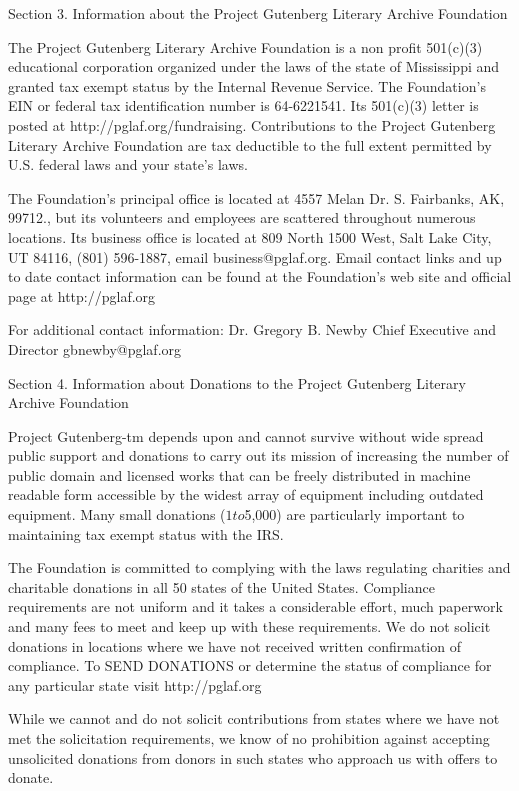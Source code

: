 Section 3.  Information about the Project Gutenberg Literary Archive
Foundation

The Project Gutenberg Literary Archive Foundation is a non profit
501(c)(3) educational corporation organized under the laws of the
state of Mississippi and granted tax exempt status by the Internal
Revenue Service.  The Foundation’s EIN or federal tax identification
number is 64-6221541.  Its 501(c)(3) letter is posted at
http://pglaf.org/fundraising.  Contributions to the Project Gutenberg
Literary Archive Foundation are tax deductible to the full extent
permitted by U.S. federal laws and your state’s laws.

The Foundation’s principal office is located at 4557 Melan Dr. S.
Fairbanks, AK, 99712., but its volunteers and employees are scattered
throughout numerous locations.  Its business office is located at
809 North 1500 West, Salt Lake City, UT 84116, (801) 596-1887, email
business@pglaf.org.  Email contact links and up to date contact
information can be found at the Foundation’s web site and official
page at http://pglaf.org

For additional contact information:
     Dr. Gregory B. Newby
     Chief Executive and Director
     gbnewby@pglaf.org


Section 4.  Information about Donations to the Project Gutenberg
Literary Archive Foundation

Project Gutenberg-tm depends upon and cannot survive without wide
spread public support and donations to carry out its mission of
increasing the number of public domain and licensed works that can be
freely distributed in machine readable form accessible by the widest
array of equipment including outdated equipment.  Many small donations
($1 to $5,000) are particularly important to maintaining tax exempt
status with the IRS.

The Foundation is committed to complying with the laws regulating
charities and charitable donations in all 50 states of the United
States.  Compliance requirements are not uniform and it takes a
considerable effort, much paperwork and many fees to meet and keep up
with these requirements.  We do not solicit donations in locations
where we have not received written confirmation of compliance.  To
SEND DONATIONS or determine the status of compliance for any
particular state visit http://pglaf.org

While we cannot and do not solicit contributions from states where we
have not met the solicitation requirements, we know of no prohibition
against accepting unsolicited donations from donors in such states who
approach us with offers to donate.

